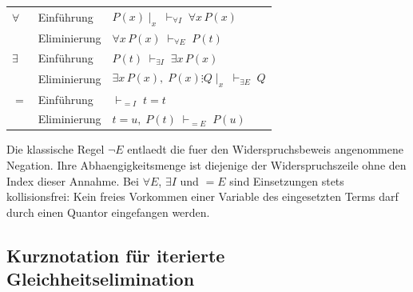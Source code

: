 \documentclass[main.tex]{subfiles}
\begin{document}
\begin{center}
\begin{tabularx}{\textwidth}{@{}l l X@{}}
    $\forall$
      & Einführung
      & \label{rule:UI}%
        \(P(x)\mid_x \;\vdash_{\forall I}\; \forall x\,P(x)\) \\[0.6ex]
      & Eliminierung
      & \label{rule:UE}%
        \(\forall x\,P(x) \;\vdash_{\forall E}\; P(t)\) \\[0.9ex]

    $\exists$
      & Einführung
      & \label{rule:EI}%
        \(P(t) \;\vdash_{\exists I}\; \exists x\,P(x)\) \\[0.6ex]
      & Eliminierung
      & \label{rule:EE}%
        \(\exists x\,P(x),\; P(x)\vdots Q\mid_x
          \;\vdash_{\exists E}\; Q\) \\[0.9ex]

    $=$
      & Einführung
      & \label{rule:II}%
        \(\vdash_{= I}\; t = t\) \\[0.6ex]
      & Eliminierung
      & \label{rule:IE}%
        \(t = u,\; P(t) \;\vdash_{= E}\; P(u)\) \\
    \bottomrule
  \end{tabularx}
\end{center}

Die klassische Regel \(\neg E\) entlaedt die fuer den
Widerspruchsbeweis angenommene Negation. Ihre Abhaengigkeitsmenge
ist diejenige der Widerspruchszeile ohne den Index dieser Annahme.
Bei \(\forall E\), \(\exists I\) und \(=E\) sind Einsetzungen
stets kollisionsfrei: Kein freies Vorkommen einer Variable des
eingesetzten Terms darf durch einen Quantor eingefangen werden.

\subsection{Kurznotation für iterierte Gleichheitselimination}
\end{document}
